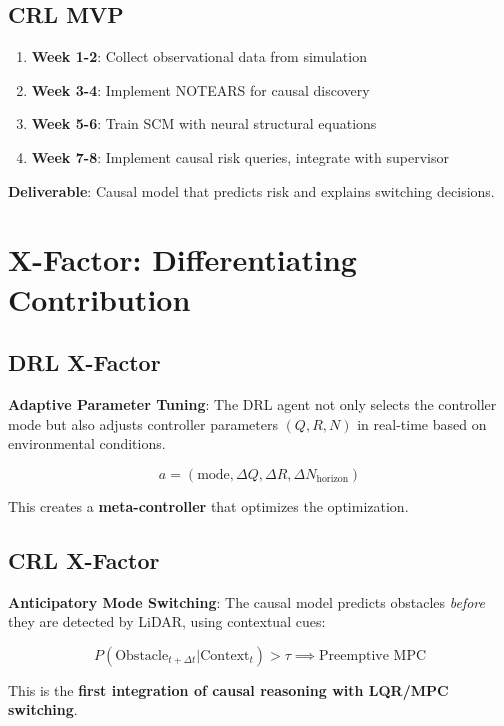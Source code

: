 \documentclass[11pt,a4paper]{article}
\begin{document}
\subsection{CRL MVP}

\begin{enumerate}
  \item \textbf{Week 1-2}: Collect observational data from simulation
  \item \textbf{Week 3-4}: Implement NOTEARS for causal discovery
  \item \textbf{Week 5-6}: Train SCM with neural structural equations
  \item \textbf{Week 7-8}: Implement causal risk queries, integrate with supervisor
\end{enumerate}

\textbf{Deliverable}: Causal model that predicts risk and explains switching decisions.

\section{X-Factor: Differentiating Contribution}

\subsection{DRL X-Factor}

\begin{drlbox}
\textbf{Adaptive Parameter Tuning}: The DRL agent not only selects the controller mode but also adjusts controller parameters $(Q, R, N)$ in real-time based on environmental conditions.

\begin{equation}
  a = (\text{mode}, \Delta Q, \Delta R, \Delta N_{\text{horizon}})
\end{equation}

This creates a \textbf{meta-controller} that optimizes the optimization.
\end{drlbox}

\subsection{CRL X-Factor}

\begin{crlbox}
\textbf{Anticipatory Mode Switching}: The causal model predicts obstacles \textit{before} they are detected by LiDAR, using contextual cues:

\begin{equation}
  P(\text{Obstacle}_{t+\Delta t} | \text{Context}_t) > \tau \implies \text{Preemptive MPC}
\end{equation}

This is the \textbf{first integration of causal reasoning with LQR/MPC switching}.
\end{crlbox}
\end{document}

